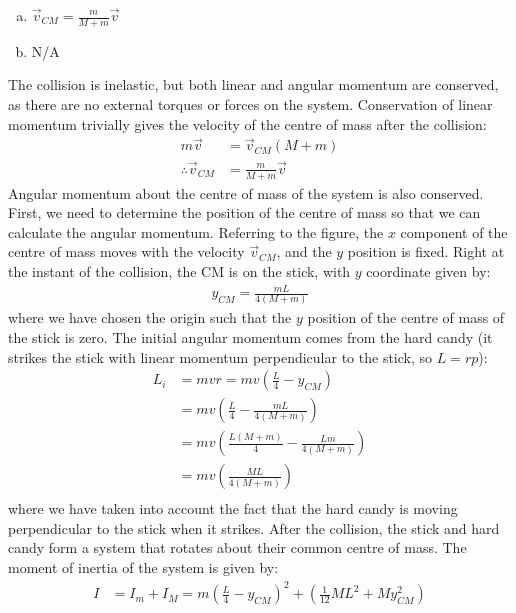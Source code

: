 \begin{finalanswer}
\begin{enumerate}[(a)]
\item $\vec v_{CM}=\frac{m}{M+m}\vec v$
\item N/A
\end{enumerate}

\end{finalanswer}
\begin{solution}
The collision is inelastic, but both linear and angular momentum are conserved, as there are no external torques or forces on the system. Conservation of linear momentum trivially gives the velocity of the centre of mass after the collision:
\begin{align*}
m\vec v &= \vec v_{CM}(M+m)\\
\therefore \vec v_{CM} &=\frac{m}{M+m}\vec v
\end{align*}
Angular momentum about the centre of mass of the system is also conserved. First, we need to determine the position of the centre of mass so that we can calculate the angular momentum. Referring to the figure, the $x$ component of the centre of mass moves with the velocity $\vec v_{CM}$, and the $y$ position is fixed. Right at the instant of the collision, the CM is on the stick, with $y$ coordinate given by:
\begin{align*}
y_{CM}=\frac{mL}{4(M+m)}
\end{align*}
where we have chosen the origin such that the $y$ position of the centre of mass of the stick is zero. The initial angular momentum comes from the hard candy (it strikes the stick with linear momentum perpendicular to the stick, so $L=rp$):
\begin{align*}
L_i&=mvr=mv\left(\frac{L}{4}-y_{CM}\right)\\
&=mv\left(\frac{L}{4}-\frac{mL}{4(M+m)}\right)\\
&=mv\left(\frac{L(M+m)}{4}-\frac{Lm}{4(M+m)}\right)\\
&=mv\left(\frac{ML}{4(M+m)}\right)\\
\end{align*}
where we have taken into account the fact that the hard candy is moving perpendicular to the stick when it strikes. After the collision, the stick and hard candy form a system that rotates about their common centre of mass. The moment of inertia of the system is given by:
\begin{align*}
I &= I_m+I_M=m\left(\frac{L}{4}-y_{CM}\right)^2+\left(\frac{1}{12}ML^2+M y_{CM}^2\right)\\

\end{align*}
\end{solution}
